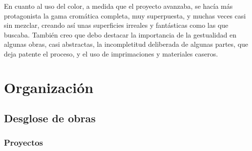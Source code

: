 \documentclass[twoside,twocolumn]{article}
\begin{document}
En cuanto al uso del color, a medida que el proyecto avanzaba, se hacía
más protagonista la gama cromática completa, muy superpuesta, y muchas
veces casi sin mezclar, creando así unas superficies irreales y
fantásticas como las que buscaba. También creo que debo destacar la
importancia de la gestualidad en algunas obras, casi abstractas, la
incompletitud deliberada de algunas partes, que deja patente el proceso,
y el uso de imprimaciones y materiales caseros.

\clearpage

\hypertarget{organizaciuxf3n}{%
\section{Organización}\label{organizaciuxf3n}}

\hypertarget{desglose-de-obras}{%
\subsection{Desglose de obras}\label{desglose-de-obras}}

\hypertarget{proyectos}{%
\subsubsection{Proyectos}\label{proyectos}}
\end{document}
